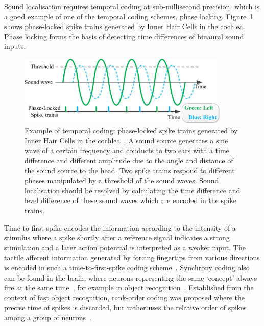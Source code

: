 Sound localisation requires temporal coding at sub-millisecond precision, which is a good example of one of the temporal coding schemes, phase locking.
Figure~\ref{Fig:audio_fibre} shows phase-locked spike trains generated by Inner Hair Cells in the cochlea.
Phase locking forms the basis
of detecting time differences of binaural sound inputs.
\begin{figure}[bt]
	\centering
	\includegraphics[width=0.9\textwidth]{pics_snn/phaselocking.png}
	\caption{Example of temporal coding: phase-locked spike trains generated by Inner Hair Cells in the cochlea~\citep{liu2013modeling}.
	A sound source generates a sine wave of a certain frequency and conducts to two ears with a time difference and different amplitude due to the angle and distance of the sound source to the head.
	Two spike trains respond to different phases manipulated by a threshold of the sound waves.
	Sound localisation should be resolved by calculating the time difference and level difference of these sound waves which are encoded in the spike trains.
    }
	\label{Fig:audio_fibre}
\end{figure}

Time-to-first-spike encodes the information according to the intensity of a stimulus where a spike shortly after a reference signal indicates a strong stimulation and a later action potential is interpreted as a weaker input.
The tactile afferent information generated by forcing fingertips from various directions is encoded in such a time-to-first-spike coding scheme~\citep{johansson2004first}.
Synchrony coding also can be found in the brain, where neurons representing the same `concept' always fire at the same time~\citep{von1994correlation}, for example in object recognition~\citep{gray1989stimulus}.
Established from the context of fast object recognition, rank-order coding was proposed where the precise time of spikes is discarded, but rather uses the relative order of spikes among a group of neurons~\citep{gautrais1998rate}.


